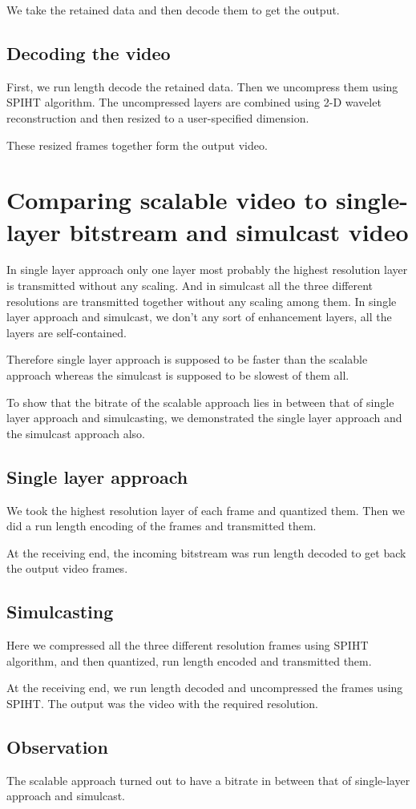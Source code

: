 \documentclass[10pt,twocolumn]{article}
\begin{document}
We take the retained data and then decode them to get the output.

\subsection*{Decoding the video}
First, we run length decode the retained data. Then we uncompress them using SPIHT\cite{amirSaid1996} algorithm. The uncompressed layers are combined using 2-D wavelet reconstruction and then resized to a user-specified dimension.

These resized frames together form the output video.

\section{Comparing scalable video to single-layer bitstream and simulcast video}

In single layer approach only one layer most probably the highest resolution layer is transmitted without any scaling. And in simulcast all the three different resolutions are transmitted together without any scaling among them. In single layer approach and simulcast, we don't any sort of enhancement layers, all the layers are self-contained.

Therefore single layer approach is supposed to be faster than the scalable approach whereas the simulcast is supposed to be slowest of them all.

To show that the bitrate of the scalable approach lies in between that of single layer approach and simulcasting, we demonstrated the single layer approach and the simulcast approach also.

\subsection*{Single layer approach}
We took the highest resolution layer of each frame and quantized them. Then we did a run length encoding of the frames and transmitted them.

At the receiving end, the incoming bitstream was run length decoded to get back the output video frames.

\subsection*{Simulcasting}

Here we compressed all the three different resolution frames using SPIHT algorithm, and then quantized, run length encoded and transmitted them.

At the receiving end, we run length decoded and uncompressed the frames using SPIHT. The output was the video with the required resolution.

\subsection*{Observation}
The scalable approach turned out to have a bitrate in between that of single-layer approach and simulcast.




\end{document}
